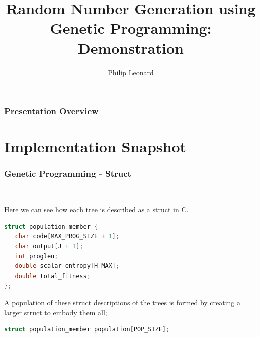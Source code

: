 \documentclass{beamer}
\title[Short title]{Random Number Generation using Genetic Programming: Demonstration} %
\author{Philip Leonard} %
\institute[UoL] %
{
University of Liverpool \\ %
\medskip
Primary Supervisor: Dr. David Jackson\\ Secondary Supervisor: Professor Paul E. Dunne\\
\medskip
\textit{sgpleona@student.liverpool.ac.uk} %
}
\date{} %
\begin{document}
\begin{frame}
\titlepage %
\end{frame}

\begin{frame}
\frametitle{Presentation Overview} %
\tableofcontents %
\end{frame}


\section{Implementation Snapshot} %

\begin{frame}[fragile]
\frametitle{Genetic Programming - Struct}\

Here we can see how each tree is described as a struct in C.\newline

\begin{lstlisting}[language=C]
struct population_member {
   char code[MAX_PROG_SIZE + 1];
   char output[J + 1];
   int proglen;
   double scalar_entropy[H_MAX];
   double total_fitness;
};
\end{lstlisting}

A population of these struct descriptions of the trees is formed by creating a larger struct to embody them all;\newline
\begin{lstlisting}[language=C]
struct population_member population[POP_SIZE];
\end{lstlisting}

\end{frame}
\end{document}
